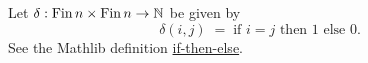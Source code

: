 \medskip

\begin{definition}
\label{def:d}
\leanok
Let $\delta: \mathrm{Fin}\, n \times \mathrm{Fin}\, n \to \mathbb{N}$ be given by
\renewcommand{\theequation}{d}
\begin{equation}
\label{d}
\delta(i,j) \; = \; \text{if } i=j \text{ then } 1 \text{ else } 0.
\end{equation}
\renewcommand{\theequation}{\arabic{equation}}
See the Mathlib definition \href{https://leanprover-community.github.io/mathlib4_docs/Init/Prelude.html#if-then-else}{if-then-else}.
\end{definition}
